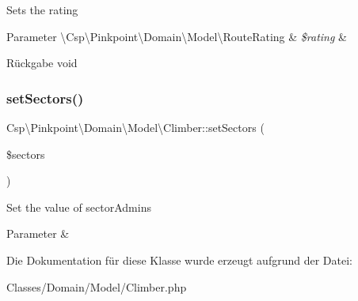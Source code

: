 Sets the rating


\begin{DoxyParams}[1]{Parameter}
\textbackslash{}\+Csp\textbackslash{}\+Pinkpoint\textbackslash{}\+Domain\textbackslash{}\+Model\textbackslash{}\+Route\+Rating & {\em \$rating} & \\
\hline
\end{DoxyParams}
\begin{DoxyReturn}{Rückgabe}
void 
\end{DoxyReturn}
\mbox{\label{classCsp_1_1Pinkpoint_1_1Domain_1_1Model_1_1Climber_a5ea7008ca262b4cc45d9efd973fee684}} 
\subsubsection{\texorpdfstring{set\+Sectors()}{setSectors()}}
{\footnotesize\ttfamily Csp\textbackslash{}\+Pinkpoint\textbackslash{}\+Domain\textbackslash{}\+Model\textbackslash{}\+Climber\+::set\+Sectors (\begin{DoxyParamCaption}\item[{\textbackslash{}T\+Y\+P\+O3\textbackslash{}\+C\+M\+S\textbackslash{}\+Extbase\textbackslash{}\+Persistence\textbackslash{}\+Object\+Storage}]{\$sectors }\end{DoxyParamCaption})}

Set the value of sector\+Admins


\begin{DoxyParams}{Parameter}
{\em } & \\
\hline
\end{DoxyParams}


Die Dokumentation für diese Klasse wurde erzeugt aufgrund der Datei\+:\begin{DoxyCompactItemize}
\item 
Classes/\+Domain/\+Model/Climber.\+php\end{DoxyCompactItemize}
